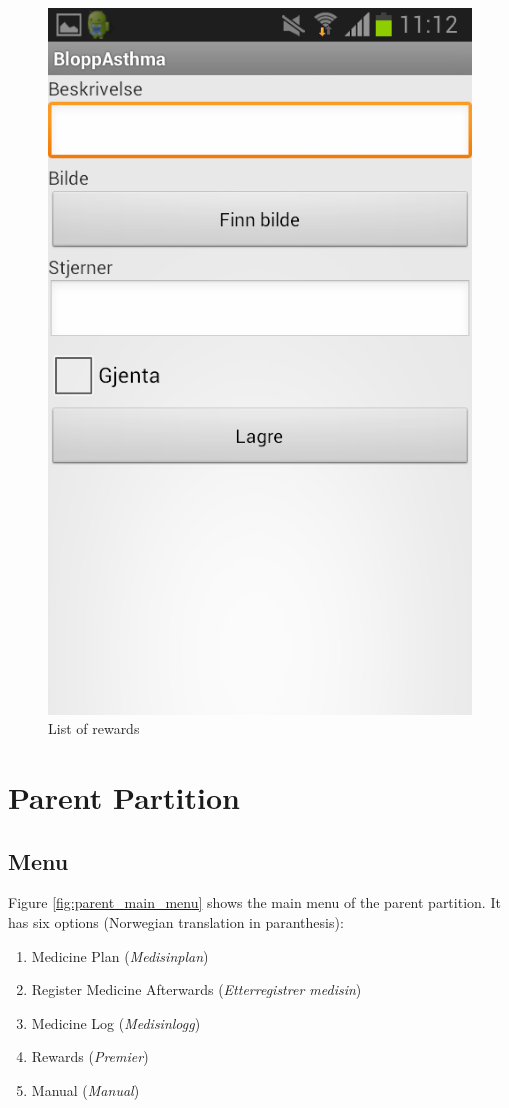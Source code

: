 \begin{figure}
\begin{minipage}[b]{0.4\linewidth}
			\includegraphics[width=0.20\paperwidth]{Pictures/app-screenshots/add_reward.png}
		\caption{List of rewards}
		\label{fig:add_reward}
	\end{minipage}   
\end{figure}


\section{Parent Partition}

\subsection{Menu}
\label{sec:description-menu}
Figure \ref{fig:parent_main_menu} shows the main menu of the parent partition. It has six options (Norwegian translation in paranthesis):
\begin{enumerate}
  \item Medicine Plan (\emph{Medisinplan})
  \item Register Medicine Afterwards (\emph{Etterregistrer medisin})
  \item Medicine Log (\emph{Medisinlogg})
  \item Rewards (\emph{Premier})
  \item Manual (\emph{Manual})
\end{enumerate} 

